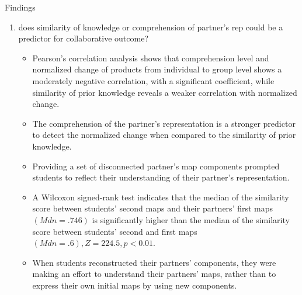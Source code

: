 \begin{frame}[allowframebreaks]{Findings}
\begin{enumerate}
    \item does similarity of knowledge or comprehension of partner's rep could be a 
          predictor for collaborative outcome?
          \begin{itemize}
              \item Pearson’s correlation analysis shows that comprehension level and normalized change of products from individual to group level shows a moderately negative correlation, with a significant coefficient, while similarity of prior knowledge reveals a weaker correlation with normalized change. 
              \item The comprehension of the partner’s representation is a stronger predictor to detect the normalized change when compared to the similarity of prior knowledge.
              \item Providing a set of disconnected partner's map components prompted students to reflect their understanding of their partner's representation.
              \item A Wilcoxon signed-rank test indicates that the median of the similarity score between students' second maps and their partners' first maps $(Mdn = .746)$ is significantly higher than the median of the similarity score between students' second and first maps $(Mdn=.6), Z= 224.5, p<0.01$.
              \item When students reconstructed their partners' components,  they were making an effort to understand their partners' maps, rather than to express their own initial maps by using new components.
          \end{itemize}
          

\end{enumerate}
\end{frame}
